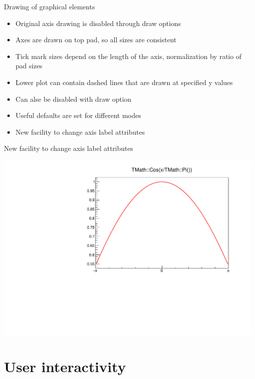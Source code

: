 \documentclass{beamer}
\begin{document}
\begin{frame}[t]{Drawing of graphical elements}
  \begin{itemize}
    \item Original axis drawing is disabled through draw options
    \item Axes are drawn on top pad, so all sizes are consistent
    \item Tick mark sizes depend on the length of the axis, normalization by ratio of pad sizes
  \end{itemize}

  \begin{itemize}
    \item Lower plot can contain dashed lines that are drawn at specified y values
    \item Can alse be disabled with draw option
    \item Useful defaults are set for different modes
  \end{itemize}

  \begin{itemize}
    \item New facility to change axis label attributes
  \end{itemize}
\end{frame}

\begin{frame}[t]{New facility to change axis label attributes}
  \tiny
  
  \centering
	\includegraphics[width=0.7\linewidth]{assets/tgaxis.pdf}
  
\end{frame}

\section{User interactivity}
\end{document}
